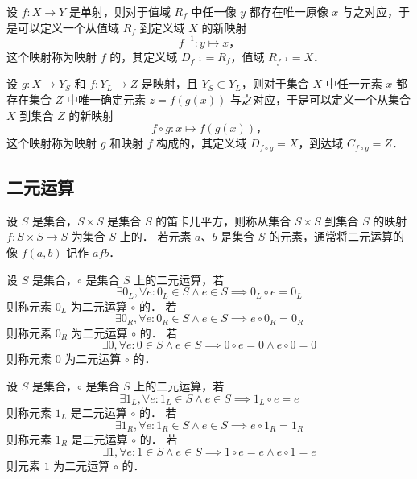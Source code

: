 \begin{Definition}\label{Definition:InverseMap}
    设 $ f: X \to Y $ 是单射，则对于值域 $R_f$ 中任一像 $y$ 都存在唯一原像 $x$ 与之对应，于是可以定义一个从值域 $R_f$ 到定义域 $X$ 的新映射
    \[ f^{-1}: y \mapsto x \text{，} \]
    这个映射称为映射 $f$ 的，其定义域 $ D_{f^{-1}} = R_f $，值域 $ R_{f^{-1}} = X $．
\end{Definition}

\begin{Definition}\label{Definition:CompositeMap}
    设 $ g: X \to Y_S $ 和 $ f: Y_L \to Z $ 是映射，且 $ Y_S \subset Y_L $，则对于集合 $X$ 中任一元素 $x$ 都存在集合 $Z$ 中唯一确定元素 $ z = f(g(x)) $ 与之对应，于是可以定义一个从集合 $X$ 到集合 $Z$ 的新映射
    \[ f \circ g: x \mapsto f(g(x)) \text{，} \]
    这个映射称为映射 $g$ 和映射 $f$ 构成的，其定义域 $ D_{f\circ{}g} = X $，到达域 $ C_{f\circ{}g} = Z $．
\end{Definition}

\subsection{二元运算}

\begin{Definition}\label{Definition:BinaryOperation}
    设 $S$ 是集合，$ S \times S $ 是集合 $S$ 的笛卡儿平方，则称从集合 $ S \times S $ 到集合 $S$ 的映射 $ f: S \times S \to S $ 为集合 $S$ 上的．
    若元素 $a$、$b$ 是集合 $S$ 的元素，通常将二元运算的像 $ f(a, b) $ 记作 $ a f b $．
\end{Definition}

\begin{Definition}[\textbf{零元}]\label{Definition:ZeroElement}
    设 $S$ 是集合，$\circ$ 是集合 $S$ 上的二元运算，若
    \[ \exists 0_L, \forall e : 0_L \in S \land e \in S \implies 0_L \circ e = 0_L \]
    则称元素 $0_L$ 为二元运算 $\circ$ 的．
    若
    \[ \exists 0_R, \forall e : 0_R \in S \land e \in S \implies e \circ 0_R = 0_R \]
    则称元素 $0_R$ 为二元运算 $\circ$ 的．
    若
    \[ \exists 0, \forall e : 0 \in S \land e \in S \implies 0 \circ e = 0 \land e \circ 0 = 0 \]
    则称元素 $0$ 为二元运算 $\circ$ 的．
\end{Definition}

\begin{Definition}[\textbf{幺元}]\label{Definition:IdentityElement}
    设 $S$ 是集合，$\circ$ 是集合 $S$ 上的二元运算，若
    \[ \exists 1_L, \forall e : 1_L \in S \land e \in S \implies 1_L \circ e = e \]
    则称元素 $1_L$ 是二元运算 $\circ$ 的．
    若
    \[ \exists 1_R, \forall e : 1_R \in S \land e \in S \implies e \circ 1_R = 1_R \]
    则称元素 $1_R$ 是二元运算 $\circ$ 的．
    若
    \[ \exists 1, \forall e : 1 \in S \land e \in S \implies 1 \circ e = e \land e \circ 1 = e \]
    则元素 $1$ 为二元运算 $\circ$ 的．
\end{Definition}

